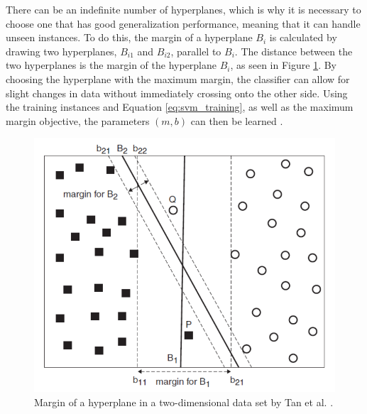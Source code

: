    There can be an indefinite number of hyperplanes, which is why it is necessary to choose one that has good generalization performance, meaning that it can handle unseen instances. To do this, the margin of a hyperplane $B_i$ is calculated by drawing two hyperplanes, $B_{i1}$ and $B_{i2}$, parallel to $B_i$. The distance between the two hyperplanes is the margin of the hyperplane $B_i$, as seen in Figure \ref{fig:svm}. By choosing the hyperplane with the maximum margin, the classifier can allow for slight changes in data without immediately crossing onto the other side. Using the training instances and Equation \eqref{eq:svm_training}, as well as the maximum margin objective, the parameters $(m,b)$ can then be learned \cite{DBLP:books/aw/TanSKK2019}.

    \begin{figure}
        \centering
        \caption{Margin of a hyperplane in a two-dimensional data set by Tan et al. \cite[p.~479]{DBLP:books/aw/TanSKK2019}.
        \label{fig:svm}
        }
        \includegraphics[scale=0.7]{Images/SVM_image.png}
    \end{figure}
    


    